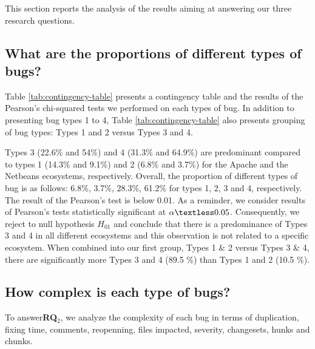 \documentclass[natbib]{svjour3}
\begin{document}
This section reports the analysis of the results aiming at answering our
three research questions.

\subsection{What are the proportions of different types of
bugs?}\label{what-are-the-proportions-of-different-types-of-bugs-1}



Table \ref{tab:contingency-table} presents a contingency table and the
results of the Pearson's chi-squared tests we performed on each types of
bug. In addition to presenting bug types 1 to 4, Table
\ref{tab:contingency-table} also presents grouping of bug types: Types 1
and 2 versus Types 3 and 4.

Types 3 (22.6\% and 54\%) and 4 (31.3\% and 64.9\%) are predominant
compared to types 1 (14.3\% and 9.1\%) and 2 (6.8\% and 3.7\%) for the
Apache and the Netbeans ecosystems, respectively. Overall, the
proportion of different types of bug is as follows: 6.8\%, 3.7\%,
28.3\%, 61.2\% for types 1, 2, 3 and 4, respectively. The result of the
Pearson's test is below 0.01. As a reminder, we consider results of
Pearson's tests statistically significant at \(\alpha \textless0.05\).
Consequently, we reject to null hypothesis \(H_{01}\) and conclude that
there is a predominance of Types 3 and 4 in all different ecosystems and
this observation is not related to a specific ecosystem. When combined
into our first group, Types 1 \& 2 versus Types 3 \& 4, there are
significantly more Types 3 and 4 (89.5 \%) than Types 1 and 2 (10.5 \%).

\subsection{How complex is each type of
bugs?}\label{how-complex-is-each-type-of-bugs-1}

To answer\textbf{RQ\(_2\)}, we analyze the complexity of each bug in
terms of duplication, fixing time, comments, reopenning, files impacted,
severity, changesets, hunks and chunks.
\end{document}
